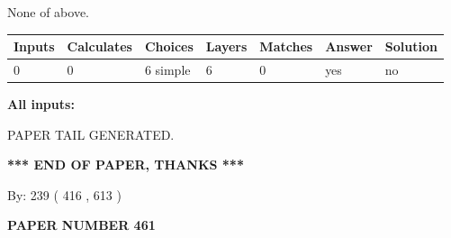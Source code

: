 \documentclass[12pt]{article}
\begin{document}
 
\noindent{}
 
 
 None of above.
 
 
\noindent{}
 
 
   
   
   
   
\noindent\begin{tabular}{|l|l|l|l|l|l|l|}
 \hline
Inputs & Calculates & Choices & Layers & Matches & Answer & Solution \\ \hline
 0  & 
 0  & 
 6
  simple  
  & 
 6  & 
 0  & 
  yes & 
  no 
  \\ \hline
 \end{tabular}
   
   
   
   
\noindent{}
   
   
   
   
\noindent\vspace{0.1in}\hspace{-0.08in} {\textbf{\Large{All inputs: }}}
   
   
   
   
   
   
 \vspace{0.2in}
 
   
   
\vspace{2.0in} PAPER TAIL GENERATED.
   
   
   
   
\vspace{1.0in} 
{\textbf{\large{ *** END OF PAPER, THANKS *** }}} 
   
   
\hspace{1.0in} By: 
 239 ( 416 ,  613 )
   
   
   
   
\newpage 
\setcounter{page}{ 
   461001 } 
   
   
   
   
 {\textbf{ \Large{ PAPER NUMBER  461  }}}
   
   
\vspace{0.2in}
   
   
   
\end{document}
